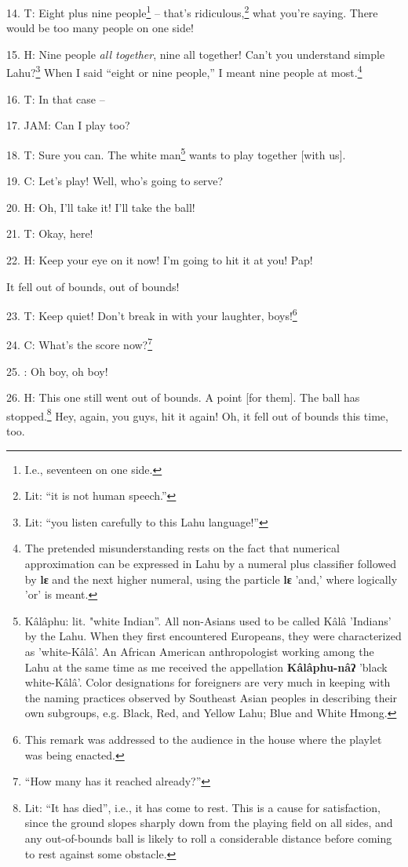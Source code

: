 14. T:  Eight plus nine people\footnote{I.e., seventeen on one side.}
-- that's ridiculous,\footnote{Lit: ``it is not human speech.''} what you're saying. There would be too many people on
one side!

15. H: Nine people \textit{all together}, nine all together! Can't you understand
simple Lahu?\footnote{Lit: ``you listen carefully to this Lahu language!''} When I said ``eight or nine people,'' I meant
nine people at most.\footnote{The pretended misunderstanding rests on the fact that numerical approximation can be expressed in Lahu by a numeral plus classifier followed by \textbf{lɛ} and the next higher numeral, using the particle \textbf{lɛ} 'and,' where logically 'or' is meant.}

16. T: In that case --

17. JAM: Can I play too?

18. T: Sure you can. The white man\footnote{Kâlâphu: lit. "white Indian''. All non-Asians used to be called Kâlâ 'Indians' by the Lahu. When they first encountered Europeans, they were characterized as 'white-Kâlâ'. An African American anthropologist working among the Lahu at the same time as me received the appellation \textbf{Kâlâphu-nâʔ} 'black white-Kâlâ'. Color designations for foreigners are very much in keeping with the naming practices observed by Southeast Asian peoples in describing their own subgroups, e.g. Black, Red, and Yellow Lahu; Blue and White Hmong.} wants to play together [with us].

19. C: Let's play! Well, who's going to serve?

20. H: Oh, I'll take it! I'll take the ball!

21. T: Okay, here!

22. H: Keep your eye on it now! I'm going to hit it at you! Pap!


It fell out of bounds, out of bounds!

23. T: Keep quiet! Don't break in with your laughter, boys!\footnote{This remark was addressed to the audience in the house where the playlet was being enacted.}

24. C: What's the score now?\footnote{``How many has it reached already?''}

25. : Oh boy, oh boy!

26. H: This one still went out of bounds. A point [for them]. The ball has stopped.\footnote{Lit: ``It has died'', i.e., it has come to rest. This is a cause for satisfaction, since the ground slopes sharply down from the playing field on all sides, and any out-of-bounds ball is likely to roll a considerable distance before coming to rest against some obstacle.}
Hey, again, you guys, hit it again! Oh, it fell out of bounds this time, too.

